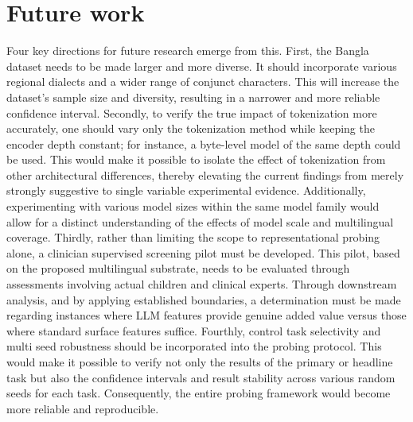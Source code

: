 \documentclass[preprint,12pt]{elsarticle}
\begin{document}
\section{Future work}
\label{sec:future}
Four key directions for future research emerge from this. First, the Bangla dataset needs to be made larger and more diverse. It should incorporate various regional dialects and a wider range of conjunct characters. This will increase the dataset's sample size and diversity, resulting in a narrower and more reliable confidence interval. Secondly, to verify the true impact of tokenization more accurately, one should vary only the tokenization method while keeping the encoder depth constant; for instance, a byte-level model of the same depth could be used. This would make it possible to isolate the effect of tokenization from other architectural differences, thereby elevating the current findings from merely strongly suggestive to single variable experimental evidence. Additionally, experimenting with various model sizes within the same model family would allow for a distinct understanding of the effects of model scale and multilingual coverage. Thirdly, rather than limiting the scope to representational probing alone, a clinician supervised screening pilot must be developed. This pilot, based on the proposed multilingual substrate, needs to be evaluated through assessments involving actual children and clinical experts. Through downstream analysis, and by applying established boundaries, a determination must be made regarding instances where LLM features provide genuine added value versus those where standard surface features suffice. Fourthly, control task selectivity and multi seed robustness should be incorporated into the probing protocol. This would make it possible to verify not only the results of the primary or headline task but also the confidence intervals and result stability across various random seeds for each task. Consequently, the entire probing framework would become more reliable and reproducible.

\end{document}
